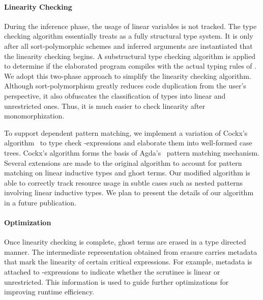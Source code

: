 \paragraph{\textbf{Linearity Checking}}
During the inference phase, the usage of linear variables is not tracked. The
type checking algorithm essentially treats \TLLC{} as a fully structural type
system. It is only after all sort-polymorphic schemes and inferred arguments are
instantiated that the linearity checking begins. A substructural type checking
algorithm is applied to determine if the elaborated program compiles with the actual
typing rules of \TLLC{}. We adopt this two-phase approach to simplify the linearity
checking algorithm. Although sort-polymorphism greatly reduces code duplication from
the user's perspective, it also obfuscates the classification of types into linear
and unrestricted ones. Thus, it is much easier to check linearity after monomorphization.

To support dependent pattern matching, we implement a variation of 
Cockx's algorithm~\cite{cockx18} to type check \Match{}-expressions and elaborate them
into well-formed case trees. Cockx's algorithm forms the basis of Agda's~\cite{agda}
pattern matching mechanism. Several extensions are made to the original algorithm to
account for pattern matching on linear inductive types and ghost terms. Our modified
algorithm is able to correctly track resource usage in subtle cases such as nested
patterns involving linear inductive types. We plan to present the details of our
algorithm in a future publication.

\paragraph{\textbf{Optimization}}
Once linearity checking is complete, ghost terms are erased in a type directed manner.
The intermediate representation obtained from erasure carries metadata that mark the
linearity of certain critical expressions. For example, metadata is attached to \Match{}-expressions
to indicate whether the scrutinee is linear or unrestricted. This information is used to
guide further optimizations for improving runtime efficiency.